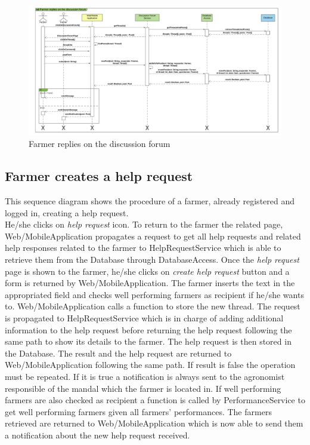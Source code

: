 \newpage
\begin{landscape}
\begin{figure}[h]
\vspace*{-2cm}
\noindent
\centering
\centerline{\includegraphics[scale= 0.108]{./Images/Sequence diagram/Farmer replies on the discussion forum.png}}
    \caption{Farmer replies on the discussion forum}
    \vspace*{-12cm}
\end{figure}
\fillandplacepagenumber
\end{landscape}

\subsection{Farmer creates a help request}

This sequence diagram shows the procedure of a farmer, already registered and logged in, creating a help request.\\
He/she clicks on \textit{help request} icon. To return to the farmer the related page, Web/MobileApplication propagates a request to get all help requests and related help responses related to the farmer to HelpRequestService which is able to retrieve them from the Database through DatabaseAccess. 
Once the \textit{help request} page is shown to the farmer, he/she clicks on \textit{create help request} button and a form is returned by Web/MobileApplication. The farmer inserts the text in the appropriated field and checks well performing farmers as recipient if he/she wants to. Web/MobileApplication calls a function to store the new thread. The request is propagated to HelpRequestService which is in charge of  adding additional information to the help request before returning the help request following the same path to show its details to the farmer. The help request is then stored in the Database. The result and the help request are returned to Web/MobileApplication following the same path. If result is false the operation must be repeated. If it is true a notification is always sent to the agronomist responsible of the mandal which the farmer is located in. If well performing farmers are also checked as recipient a function is called by PerformanceService to get well performing farmers given all farmers' performances. The farmers retrieved are returned to Web/MobileApplication which is now able to send them a notification about the new help request received. 

